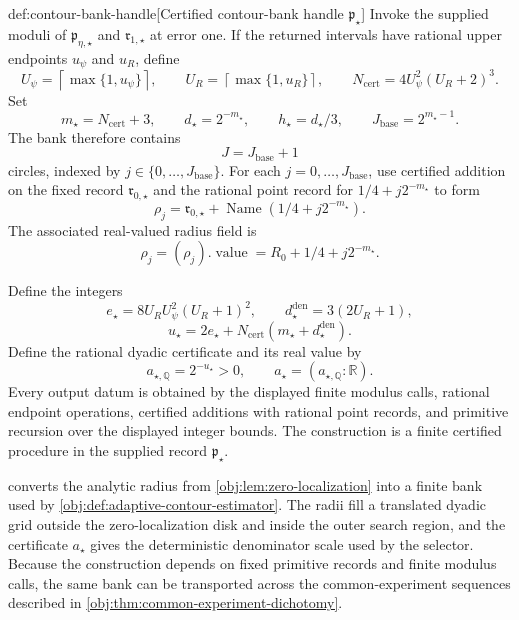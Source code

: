 \begin{definitionv}{def:contour-bank-handle}[Certified contour-bank handle $\mathfrak p_{\star}$]
Invoke the supplied moduli of \(\mathfrak p_{\eta,\star}\) and \(\mathfrak r_{1,\star}\) at error one. If the returned intervals have rational upper endpoints \(u_{\psi}\) and \(u_R\), define
\[
 U_{\psi}=\left\lceil\max\{1,u_{\psi}\}\right\rceil,
 \qquad
 U_R=\left\lceil\max\{1,u_R\}\right\rceil,
 \qquad
 N_{\mathrm{cert}}=4U_{\psi}^2(U_R+2)^3.
\]
Set
\[
 m_{\star}=N_{\mathrm{cert}}+3,
 \qquad d_{\star}=2^{-m_{\star}},
 \qquad h_{\star}=d_{\star}/3,
 \qquad J_{\mathrm{base}}=2^{m_{\star}-1}.
\]
The bank therefore contains
\[
 J=J_{\mathrm{base}}+1
\]
circles, indexed by \(j\in\{0,\ldots,J_{\mathrm{base}}\}\).
For each \(j=0,\ldots,J_{\mathrm{base}}\), use certified addition on the fixed record \(\mathfrak r_{0,\star}\) and the rational point record for \(1/4+j2^{-m_{\star}}\) to form
\[
 \mathfrak\rho_j
 =\mathfrak r_{0,\star}+\operatorname{Name}(1/4+j2^{-m_{\star}}).
\]
The associated real-valued radius field is
\[
 \rho_j=(\mathfrak\rho_j).\operatorname{value}
       =R_0+1/4+j2^{-m_{\star}}.
\]

Define the integers
\[
 e_{\star}=8U_RU_{\psi}^2(U_R+1)^2,
 \qquad
 d_{\star}^{\mathrm{den}}=3(2U_R+1),
\]
\[
 u_{\star}=2e_{\star}
 +N_{\mathrm{cert}}(m_{\star}+d_{\star}^{\mathrm{den}}).
\]
Define the rational dyadic certificate and its real value by
\[
 a_{\star,\mathbb Q}=2^{-u_{\star}}>0,
 \qquad
 a_{\star}=(a_{\star,\mathbb Q}:\mathbb R).
\]
Every output datum is obtained by the displayed finite modulus calls, rational endpoint operations, certified additions with rational point records, and primitive recursion over the displayed integer bounds. The construction is a finite certified procedure in the supplied record \(\mathfrak p_{\star}\).
\end{definitionv}

 converts the analytic radius from \cref{obj:lem:zero-localization} into a finite bank used by \cref{obj:def:adaptive-contour-estimator}. The radii fill a translated dyadic grid outside the zero-localization disk and inside the outer search region, and the certificate \(a_{\star}\) gives the deterministic denominator scale used by the selector. Because the construction depends on fixed primitive records and finite modulus calls, the same bank can be transported across the common-experiment sequences described in \cref{obj:thm:common-experiment-dichotomy}.

